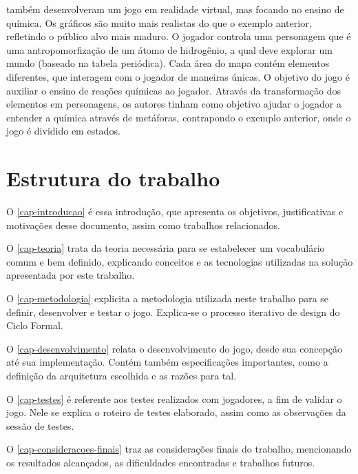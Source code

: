 \cite{Alves:2015:VR_Quimica} também desenvolveram um jogo em realidade 
virtual, mas focando no ensino de química. Os gráficos são muito mais 
realistas do que o exemplo anterior, refletindo o público alvo mais 
maduro. O jogador controla uma personagem que é uma antropomorfização 
de um átomo de hidrogênio, a qual deve explorar um mundo (baseado 
na tabela periódica). Cada área do mapa contém elementos 
diferentes, que interagem com o jogador de maneiras únicas. O objetivo 
do jogo é auxiliar o ensino de reações químicas ao jogador. Através 
da transformação dos elementos em personagens, os autores tinham como 
objetivo ajudar o jogador a entender a química através de metáforas, 
contrapondo o exemplo anterior, onde o jogo é dividido em estados.


\section{Estrutura do trabalho}\label{sec-estrutura-documento}

O \autoref{cap-introducao} é essa introdução, que apresenta os objetivos, justificativas e motivações desse documento, assim como trabalhos relacionados.

O \autoref{cap-teoria} trata da teoria necessária para se 
estabelecer um vocabulário comum e bem definido, explicando 
conceitos e as tecnologias utilizadas na solução apresentada 
por este trabalho.

O \autoref{cap-metodologia} explicita a metodologia utilizada 
neste trabalho para se definir, desenvolver e testar o jogo. 
Explica-se o processo iterativo de design do Ciclo Formal.

O \autoref{cap-desenvolvimento} relata o desenvolvimento do 
jogo, desde sua concepção até sua implementação. Contém 
também especificações importantes, como a definição da 
arquitetura escolhida e as razões para tal.

O \autoref{cap-testes} é referente aos testes realizados com 
jogadores, a fim de validar o jogo. Nele se explica o roteiro 
de testes elaborado, assim como as observações da sessão de testes.

O \autoref{cap-consideracoes-finais} traz as considerações 
finais do trabalho, mencionando os resultados alcançados, 
as dificuldades encontradas e trabalhos futuros.

